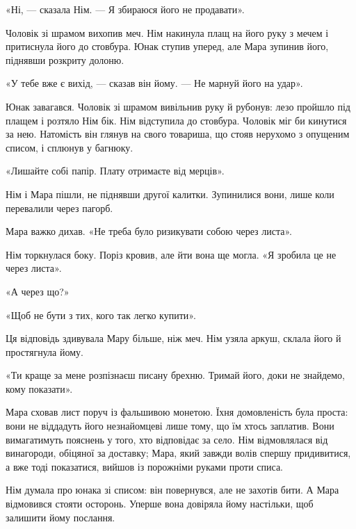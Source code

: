 \documentclass[10pt,a4paper]{article}
\begin{document}
«Ні, --- сказала Нім. --- Я збираюся його не продавати».

Чоловік зі шрамом вихопив меч. Нім накинула плащ на його руку з мечем і притиснула його до стовбура. Юнак ступив уперед, але Мара зупинив його, піднявши розкриту долоню.

«У тебе вже є вихід, --- сказав він йому. --- Не марнуй його на удар».

Юнак завагався. Чоловік зі шрамом вивільнив руку й рубонув: лезо пройшло під плащем і розтяло Нім бік. Нім відступила до стовбура. Чоловік міг би кинутися за нею. Натомість він глянув на свого товариша, що стояв нерухомо з опущеним списом, і сплюнув у багнюку.

«Лишайте собі папір. Плату отримаєте від мерців».

Нім і Мара пішли, не піднявши другої калитки. Зупинилися вони, лише коли перевалили через пагорб.

Мара важко дихав. «Не треба було ризикувати собою через листа».

Нім торкнулася боку. Поріз кровив, але йти вона ще могла. «Я зробила це не через листа».

«А через що?»

«Щоб не бути з тих, кого так легко купити».

Ця відповідь здивувала Мару більше, ніж меч. Нім узяла аркуш, склала його й простягнула йому.

«Ти краще за мене розпізнаєш писану брехню. Тримай його, доки не знайдемо, кому показати».

Мара сховав лист поруч із фальшивою монетою. Їхня домовленість була проста: вони не віддадуть його незнайомцеві лише тому, що їм хтось заплатив. Вони вимагатимуть пояснень у того, хто відповідає за село. Нім відмовлялася від винагороди, обіцяної за доставку; Мара, який завжди волів спершу придивитися, а вже тоді показатися, вийшов із порожніми руками проти списа.

Нім думала про юнака зі списом: він повернувся, але не захотів бити. А Мара відмовився стояти осторонь. Уперше вона довіряла йому настільки, щоб залишити йому послання.
\end{document}
